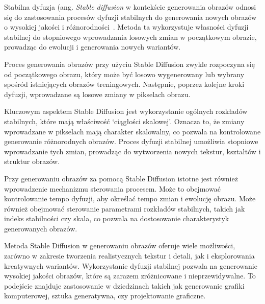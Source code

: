     Stabilna dyfuzja (ang. \textit{Stable diffusion} w kontekście generowania obrazów odnosi się do zastosowania procesów dyfuzji stabilnych do generowania nowych obrazów o wysokiej jakości i różnorodności~\cite{ramesh2022hierarchical, seneviratne2022dalle}.
    Metoda ta wykorzystuje własności dyfuzji stabilnej do stopniowego wprowadzania losowych zmian w początkowym obrazie, prowadząc do ewolucji i generowania nowych wariantów.

    Proces generowania obrazów przy użyciu Stable Diffusion zwykle rozpoczyna się od początkowego obrazu, który może być losowo wygenerowany lub wybrany spośród istniejących obrazów treningowych.
    Następnie, poprzez kolejne kroki dyfuzji, wprowadzane są losowe zmiany w pikselach obrazu.

    Kluczowym aspektem Stable Diffusion jest wykorzystanie ogólnych rozkładów stabilnych, które mają właściwość `ciągłości skalowej'.
    Oznacza to, że zmiany wprowadzane w pikselach mają charakter skalowalny, co pozwala na kontrolowane generowanie różnorodnych obrazów.
    Proces dyfuzji stabilnej umożliwia stopniowe wprowadzanie tych zmian, prowadząc do wytworzenia nowych tekstur, kształtów i struktur obrazów.

    Przy generowaniu obrazów za pomocą Stable Diffusion istotne jest również wprowadzenie mechanizmu sterowania procesem.
    Może to obejmować kontrolowanie tempo dyfuzji, aby określać tempo zmian i ewolucję obrazu.
    Może również obejmować sterowanie parametrami rozkładów stabilnych, takich jak indeks stabilności czy skala, co pozwala na dostosowanie charakterystyk generowanych obrazów.

    Metoda Stable Diffusion w generowaniu obrazów oferuje wiele możliwości, zarówno w zakresie tworzenia realistycznych tekstur i detali, jak i eksplorowania kreatywnych wariantów.
    Wykorzystanie dyfuzji stabilnej pozwala na generowanie wysokiej jakości obrazów, które są zarazem zróżnicowane i nieprzewidywalne.
    To podejście znajduje zastosowanie w dziedzinach takich jak generowanie grafiki komputerowej, sztuka generatywna, czy projektowanie graficzne.